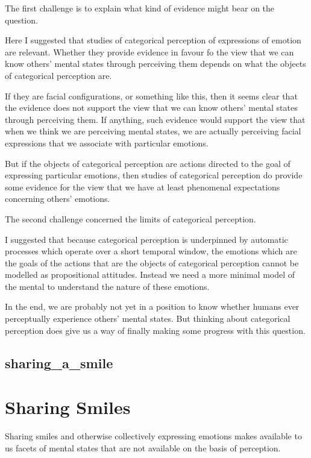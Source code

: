 \documentclass[12pt,\papersize]{extarticle}
\begin{document}
The first challenge is to explain what kind of evidence might
bear on the question.

Here I suggested that studies of categorical perception of expressions of emotion
are relevant.
Whether they provide evidence in favour fo the view that we can know others’ mental
states through perceiving them depends on what  the objects of categorical perception
are.

If they are facial configurations, or something like this, then it seems clear that
the evidence does not support the view  that we can know others’ mental
states through perceiving them.
If anything, such evidence would support the view that when we think we are perceiving
mental states, we are actually perceiving facial expressions that we associate with
particular emotions.

But if the objects of categorical perception are actions directed to the goal of expressing
particular emotions, then studies of categorical perception do provide some evidence
for the view that we have at least phenomenal expectations concerning others’ emotions.

The second challenge concerned the limits of categorical perception.

I suggested that because categorical perception is underpinned by automatic processes
which operate over a short temporal window, the emotions which are the goals of the
actions that are the objects of categorical perception cannot be modelled as propositional
attitudes.
Instead we need a more minimal model of the mental to understand the nature of these
emotions.

In the end, we are probably not yet in a position to know whether humans ever perceptually experience others' mental states.
But thinking about categorical perception does give us a way of finally making some
progress with this question.

\subsection{sharing\_a\_smile}


\section{Sharing Smiles}

Sharing smiles and otherwise collectively expressing emotions makes available to us facets of mental states that are not available on the basis of perception.
\end{document}
